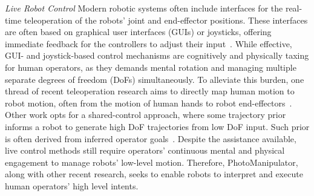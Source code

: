 
\emph{Live Robot Control} 
Modern robotic systems often include interfaces for the real-time teleoperation of the robots' joint and end-effector positions.
These interfaces are often based on graphical user interfaces (GUIs) or joysticks, offering immediate feedback for the controllers to adjust their input~\cite{darvish2023teleoperation,rea2022still}.
While effective, GUI- and joystick-based control mechanisms are cognitively and physically taxing for human operators, as they demands mental rotation and managing multiple separate degrees of freedom (DoFs) simultaneously.
To alleviate this burden, one thread of recent teleoperation research aims to directly map human motion to robot motion, often from the motion of human hands to robot end-effectors~\cite{rakita2017motion,rakita2019shared,fu2024mobile}.
Other work opts for a shared-control approach, where some trajectory prior informs a robot to generate high DoF trajectories from low DoF input.
Such prior is often derived from inferred operator goals~\cite{huang2016anticipatory,jain2019probabilistic,losey2022learning}.
Despite the assistance available, live control methods still require operators' continuous mental and physical engagement to manage robots' low-level motion.
Therefore, PhotoManipulator, along with other recent research, seeks to enable robots to interpret and execute human operators' high level intents.


